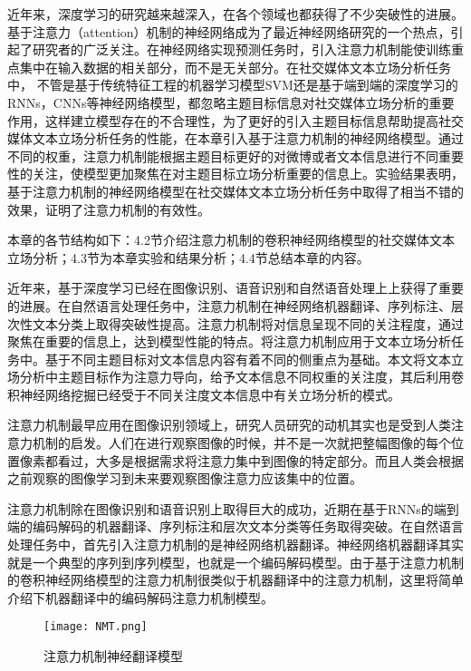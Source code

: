 

近年来，深度学习的研究越来越深入，在各个领域也都获得了不少突破性的进展。基于注意力（attention）机制的神经网络成为了最近神经网络研究的一个热点，引起了研究者的广泛关注。在神经网络实现预测任务时，引入注意力机制能使训练重点集中在输入数据的相关部分，而不是无关部分。在社交媒体文本立场分析任务中， 不管是基于传统特征工程的机器学习模型SVM还是基于端到端的深度学习的RNNs，CNNs等神经网络模型，都忽略主题目标信息对社交媒体立场分析的重要作用，这样建立模型存在的不合理性，为了更好的引入主题目标信息帮助提高社交媒体文本立场分析任务的性能，在本章引入基于注意力机制的神经网络模型。通过不同的权重，注意力机制能根据主题目标更好的对微博或者文本信息进行不同重要性的关注，使模型更加聚焦在对主题目标立场分析重要的信息上。实验结果表明，基于注意力机制的神经网络模型在社交媒体文本立场分析任务中取得了相当不错的效果，证明了注意力机制的有效性。

本章的各节结构如下：4.2节介绍注意力机制的卷积神经网络模型的社交媒体文本立场分析；4.3节为本章实验和结果分析；4.4节总结本章的内容。


近年来，基于深度学习已经在图像识别、语音识别和自然语音处理上上获得了重要的进展。在自然语言处理任务中，注意力机制在神经网络机器翻译、序列标注、层次性文本分类上取得突破性提高。注意力机制将对信息呈现不同的关注程度，通过聚焦在重要的信息上，达到模型性能的特点。将注意力机制应用于文本立场分析任务中。基于不同主题目标对文本信息内容有着不同的侧重点为基础。本文将文本立场分析中主题目标作为注意力导向，给予文本信息不同权重的关注度，其后利用卷积神经网络挖掘已经受于不同关注度文本信息中有关立场分析的模式。


注意力机制最早应用在图像识别领域上，研究人员研究的动机其实也是受到人类注意力机制的启发。人们在进行观察图像的时候，并不是一次就把整幅图像的每个位置像素都看过，大多是根据需求将注意力集中到图像的特定部分。而且人类会根据之前观察的图像学习到未来要观察图像注意力应该集中的位置。

注意力机制除在图像识别和语音识别上取得巨大的成功，近期在基于RNNs的端到端的编码解码的机器翻译、序列标注和层次文本分类等任务取得突破。在自然语言处理任务中，首先引入注意力机制的是神经网络机器翻译。神经网络机器翻译其实就是一个典型的序列到序列模型，也就是一个编码解码模型﻿。由于基于注意力机制的卷积神经网络模型的注意力机制很类似于机器翻译中的注意力机制，这里将简单介绍下机器翻译中的编码解码注意力机制模型。
\begin{figure}[htbp]
	\centering
	\texttt{[image: NMT.png]}
	\caption[rnn_vanish]{注意力机制神经翻译模型}
\end{figure}

